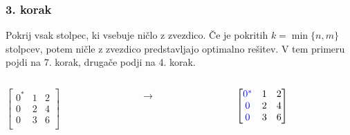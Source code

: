 \documentclass{beamer}
\begin{document}
\begin{frame}
    \frametitle{3. korak}
    \begin{block}{}
        Pokrij vsak stolpec, ki vsebuje ničlo z zvezdico. Če je pokritih $k = \min\{n,m\}$
        stolpcev, potem ničle z zvezdico predstavljajo optimalno rešitev. V tem primeru
        pojdi na 7. korak, drugače podji na 4. korak.
    \end{block} 
    \hfill
    \begin{columns}[t]
        \begin{column}{0.25\linewidth}
            $\begin{bmatrix}
                0^{*} & 1 & 2\\
                0 & 2 & 4\\
                0 & 3 & 6\\	
            \end{bmatrix}$
        \end{column}
        \begin{column}{0.005\linewidth}
         \centering
         $ \rightarrow $
        \end{column}
        \hfill
        \begin{column}{0.25\linewidth}
            \centering
            $\begin{bmatrix}
                \textcolor{blue}{0^{*}} & 1 & 2\\
                \textcolor{blue}{0} & 2 & 4\\
                \textcolor{blue}{0} & 3 & 6\\	
            \end{bmatrix}$
        \end{column}
    \end{columns}
\end{frame}
\end{document}
